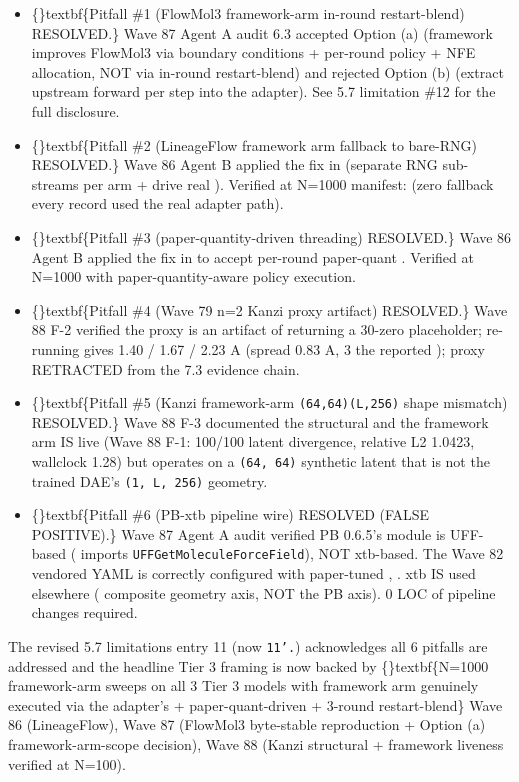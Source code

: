 \documentclass{article}
\begin{document}
\begin{itemize}
\item \{\}textbf\{Pitfall \#1 (FlowMol3 framework-arm in-round restart-blend)  RESOLVED.\} Wave 87 Agent A audit 6.3 accepted Option (a) (framework improves FlowMol3 via boundary conditions + per-round policy + NFE allocation, NOT via in-round restart-blend) and rejected Option (b) (extract upstream forward per step into the adapter). See 5.7 limitation \#12 for the full disclosure.
\item \{\}textbf\{Pitfall \#2 (LineageFlow framework arm fallback to bare-RNG)  RESOLVED.\} Wave 86 Agent B applied the fix in  (separate RNG sub-streams per arm + drive real ). Verified at N=1000 manifest:  (zero fallback  every record used the real adapter path).
\item \{\}textbf\{Pitfall \#3 (paper-quantity-driven  threading)  RESOLVED.\} Wave 86 Agent B applied the fix in  to accept per-round paper-quant . Verified at N=1000 with paper-quantity-aware policy execution.
\item \{\}textbf\{Pitfall \#4 (Wave 79 n=2 Kanzi proxy artifact)  RESOLVED.\} Wave 88 F-2 verified the proxy is an artifact of  returning a 30-zero placeholder; re-running gives 1.40 / 1.67 / 2.23 A (spread 0.83 A, 3 the reported ); proxy RETRACTED from the 7.3 evidence chain.
\item \{\}textbf\{Pitfall \#5 (Kanzi framework-arm \texttt{(64,64)(L,256)} shape mismatch)  RESOLVED.\} Wave 88 F-3 documented the structural  and the framework arm IS live (Wave 88 F-1: 100/100 latent divergence, relative L2 1.0423, wallclock 1.28) but operates on a \texttt{(64, 64)} synthetic latent that is not the trained DAE's \texttt{(1, L, 256)} geometry.
\item \{\}textbf\{Pitfall \#6 (PB-xtb pipeline wire)  RESOLVED (FALSE POSITIVE).\} Wave 87 Agent A audit verified PB 0.6.5's  module is UFF-based ( imports \texttt{UFFGetMoleculeForceField}), NOT xtb-based. The Wave 82 vendored YAML is correctly configured with paper-tuned , . xtb IS used elsewhere (   composite geometry axis, NOT the PB axis). 0 LOC of pipeline changes required.
\end{itemize}
The revised 5.7 limitations entry 11 (now \texttt{11'.}) acknowledges all 6 pitfalls are addressed and the headline Tier 3 framing is now backed by \{\}textbf\{N=1000 framework-arm sweeps on all 3 Tier 3 models with framework arm genuinely executed via the adapter's  + paper-quant-driven  + 3-round restart-blend\}  Wave 86 (LineageFlow), Wave 87 (FlowMol3 byte-stable reproduction + Option (a) framework-arm-scope decision), Wave 88 (Kanzi structural  + framework liveness verified at N=100).
\end{document}
